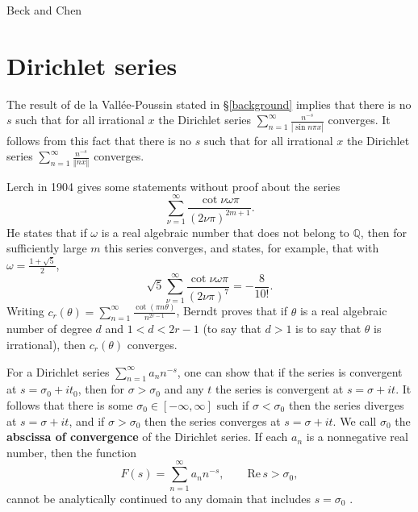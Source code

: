 \documentclass{amsart}
\newcommand{\norm}[1]{\left\Vert #1 \right\Vert}
\def\Re{\ensuremath{\mathrm{Re}}\,}
\begin{document}
Beck and Chen \cite{irregularities}






\section{Dirichlet series}
\label{dirichlet}
The result of de la Vall\'ee-Poussin \cite{valleepoussin} stated in \S \ref{background} implies that there is no $s$ such that for all irrational $x$ the Dirichlet series
$\sum_{n=1}^\infty \frac{n^{-s}}{|\sin n\pi x|}$ converges. It follows from this fact that there is no $s$ such that for all irrational $x$ the Dirichlet series
$\sum_{n=1}^\infty \frac{n^{-s}}{\norm{nx}}$ converges.

Lerch \cite{comptes} in 1904 gives some statements without proof about the series
\[
\sum_{\nu=1}^\infty \frac{\cot \nu \omega \pi}{(2\nu \pi)^{2m+1}}.
\]
He states that if $\omega$ is a real algebraic number that does not belong to $\mathbb{Q}$, then for sufficiently
large $m$ this series converges, and states, for example, that
with $\omega=\frac{1+\sqrt{5}}{2}$,
\[
\sqrt{5} \sum_{\nu=1}^\infty \frac{\cot \nu \omega \pi}{(2\nu \pi)^7} = -\frac{8}{10!}.
\]
Writing $c_r(\theta)=\sum_{n=1}^\infty \frac{\cot(\pi n \theta)}{n^{2r-1}}$, Berndt \cite[p.~135, Theorem 5.1]{berndt}
proves that if $\theta$ is a real algebraic number of degree $d$ and $1<d<2r-1$ (to say that $d>1$ is to say that $\theta$ is irrational), then
$c_r(\theta)$ converges. 


For a Dirichlet series $\sum_{n=1}^\infty a_n n^{-s}$, one can show \cite[pp.~289--290, \S 9.11]{titchmarsh} that if the series is convergent at $s=\sigma_0+it_0$, then for $\sigma>\sigma_0$ and any  $t$ the series is convergent at $s=\sigma+it$. It follows that there is some $\sigma_0 \in [-\infty,\infty]$ such if $\sigma<\sigma_0$ then the series diverges at $s=\sigma+it$, and if $\sigma>\sigma_0$ then the series converges at $s=\sigma+it$. We call $\sigma_0$ the \textbf{abscissa of convergence} of the Dirichlet series. If each $a_n$ is a nonnegative real number, then 
the function
\[
F(s)=\sum_{n=1}^\infty a_n n^{-s}, \qquad \Re s>\sigma_0,
\]
cannot be analytically continued to any domain that includes $s=\sigma_0$ \cite[p.~101, Proposition~18]{schoiss}.
\end{document}

